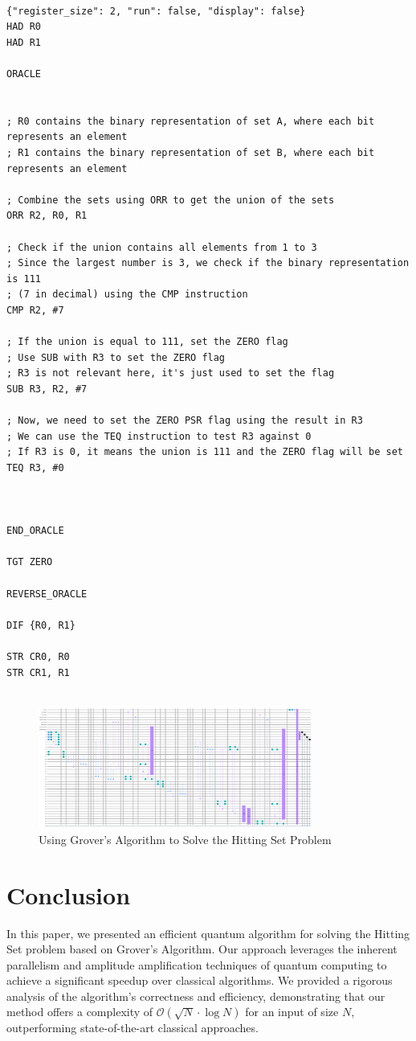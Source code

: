\begin{lstlisting}

{"register_size": 2, "run": false, "display": false}
HAD R0
HAD R1

ORACLE


; R0 contains the binary representation of set A, where each bit represents an element
; R1 contains the binary representation of set B, where each bit represents an element

; Combine the sets using ORR to get the union of the sets
ORR R2, R0, R1

; Check if the union contains all elements from 1 to 3
; Since the largest number is 3, we check if the binary representation is 111
; (7 in decimal) using the CMP instruction
CMP R2, #7

; If the union is equal to 111, set the ZERO flag
; Use SUB with R3 to set the ZERO flag
; R3 is not relevant here, it's just used to set the flag
SUB R3, R2, #7

; Now, we need to set the ZERO PSR flag using the result in R3
; We can use the TEQ instruction to test R3 against 0
; If R3 is 0, it means the union is 111 and the ZERO flag will be set
TEQ R3, #0



END_ORACLE

TGT ZERO

REVERSE_ORACLE

DIF {R0, R1}

STR CR0, R0
STR CR1, R1


\end{lstlisting}

\begin{figure}[htp]
    \centering
    \includegraphics[width=9cm]{Figures/Hitting_Set_circuit.png}
    \caption{Using Grover's Algorithm to Solve the Hitting Set Problem}
    \label{fig:Hitting_Set}
\end{figure}

\section{Conclusion}
\label{sec:conclusion}
In this paper, we presented an efficient quantum algorithm for solving the Hitting Set problem based on Grover's Algorithm. Our approach leverages the inherent parallelism and amplitude amplification techniques of quantum computing to achieve a significant speedup over classical algorithms. We provided a rigorous analysis of the algorithm's correctness and efficiency, demonstrating that our method offers a complexity of $\mathcal{O}(\sqrt{N} \cdot \log{N})$ for an input of size $N$, outperforming state-of-the-art classical approaches.

